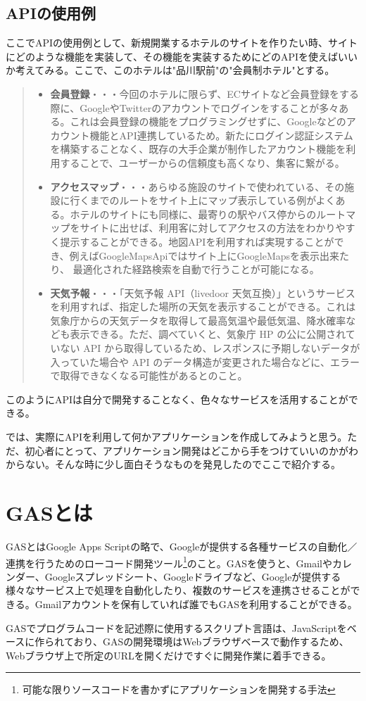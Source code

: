 \documentclass{jsarticle}
\begin{document}
\subsection{APIの使用例}
ここでAPIの使用例として、新規開業するホテルのサイトを作りたい時、サイトにどのような機能を実装して、その機能を実装するためにどのAPIを使えばいいか考えてみる。ここで、このホテルは"品川駅前"の"会員制ホテル"とする。
\begin{quote}
 	\begin{itemize}
 		 \item {\bf 会員登録}・・・今回のホテルに限らず、ECサイトなど会員登録をする際に、GoogleやTwitterのアカウントでログインをすることが多々ある。これは会員登録の機能をプログラミングせずに、Googleなどのアカウント機能とAPI連携しているため。新たにログイン認証システムを構築することなく、既存の大手企業が制作したアカウント機能を利用することで、ユーザーからの信頼度も高くなり、集客に繋がる。
 		 \item {\bf アクセスマップ}・・・あらゆる施設のサイトで使われている、その施設に行くまでのルートをサイト上にマップ表示している例がよくある。ホテルのサイトにも同様に、最寄りの駅やバス停からのルートマップをサイトに出せば、利用客に対してアクセスの方法をわかりやすく提示することができる。地図APIを利用すれば実現することができ、例えばGoogleMapsApiではサイト上にGoogleMapsを表示出来たり、	最適化された経路検索を自動で行うことが可能になる。
		  \item {\bf 天気予報}・・・「天気予報 API（livedoor 天気互換）」というサービスを利用すれば、指定した場所の天気を表示することができる。これは気象庁からの天気データを取得して最高気温や最低気温、降水確率なども表示できる。ただ、調べていくと、気象庁 HP の公に公開されていない API から取得しているため、レスポンスに予期しないデータが入っていた場合や API のデータ構造が変更された場合などに、エラーで取得できなくなる可能性があるとのこと。
 	\end{itemize}
\end{quote}
\par このようにAPIは自分で開発することなく、色々なサービスを活用することができる。
\par では、実際にAPIを利用して何かアプリケーションを作成してみようと思う。ただ、初心者にとって、アプリケーション開発はどこから手をつけていいのかがわからない。そんな時に少し面白そうなものを発見したのでここで紹介する。

\section{GASとは}
GASとはGoogle Apps Scriptの略で、Googleが提供する各種サービスの自動化／連携を行うためのローコード開発ツール\footnote{可能な限りソースコードを書かずにアプリケーションを開発する手法}のこと。GASを使うと、Gmailやカレンダー、Googleスプレッドシート、Googleドライブなど、Googleが提供する様々なサービス上で処理を自動化したり、複数のサービスを連携させることができる。Gmailアカウントを保有していれば誰でもGASを利用することができる。
\par GASでプログラムコードを記述際に使用するスクリプト言語は、JavaScriptをベースに作られており、GASの開発環境はWebブラウザベースで動作するため、Webブラウザ上で所定のURLを開くだけですぐに開発作業に着手できる。
\end{document}
